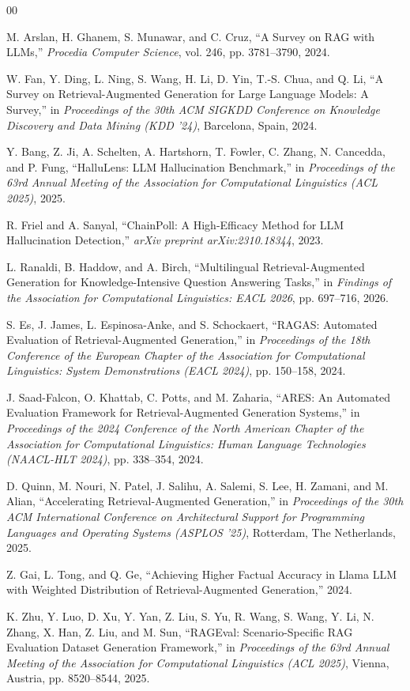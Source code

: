 \documentclass[conference]{IEEEtran}
\begin{document}
\begin{thebibliography}{00}

M. Arslan, H. Ghanem, S. Munawar, and C. Cruz,
``A Survey on RAG with LLMs,''
\textit{Procedia Computer Science}, vol. 246, pp. 3781--3790, 2024.

W. Fan, Y. Ding, L. Ning, S. Wang, H. Li, D. Yin, T.-S. Chua, and Q. Li,
``A Survey on Retrieval-Augmented Generation for Large Language Models: A Survey,''
in \textit{Proceedings of the 30th ACM SIGKDD Conference on Knowledge Discovery and Data Mining (KDD '24)}, Barcelona, Spain, 2024.

Y. Bang, Z. Ji, A. Schelten, A. Hartshorn, T. Fowler, C. Zhang, N. Cancedda, and P. Fung,
``HalluLens: LLM Hallucination Benchmark,''
in \textit{Proceedings of the 63rd Annual Meeting of the Association for Computational Linguistics (ACL 2025)}, 2025.

R. Friel and A. Sanyal,
``ChainPoll: A High-Efficacy Method for LLM Hallucination Detection,''
\textit{arXiv preprint arXiv:2310.18344}, 2023.

L. Ranaldi, B. Haddow, and A. Birch,
``Multilingual Retrieval-Augmented Generation for Knowledge-Intensive Question Answering Tasks,''
in \textit{Findings of the Association for Computational Linguistics: EACL 2026}, pp. 697--716, 2026.

S. Es, J. James, L. Espinosa-Anke, and S. Schockaert,
``RAGAS: Automated Evaluation of Retrieval-Augmented Generation,''
in \textit{Proceedings of the 18th Conference of the European Chapter of the Association for Computational Linguistics: System Demonstrations (EACL 2024)}, pp. 150--158, 2024.

J. Saad-Falcon, O. Khattab, C. Potts, and M. Zaharia,
``ARES: An Automated Evaluation Framework for Retrieval-Augmented Generation Systems,''
in \textit{Proceedings of the 2024 Conference of the North American Chapter of the Association for Computational Linguistics: Human Language Technologies (NAACL-HLT 2024)}, pp. 338--354, 2024.

D. Quinn, M. Nouri, N. Patel, J. Salihu, A. Salemi, S. Lee, H. Zamani, and M. Alian,
``Accelerating Retrieval-Augmented Generation,''
in \textit{Proceedings of the 30th ACM International Conference on Architectural Support for Programming Languages and Operating Systems (ASPLOS '25)}, Rotterdam, The Netherlands, 2025.

Z. Gai, L. Tong, and Q. Ge,
``Achieving Higher Factual Accuracy in Llama LLM with Weighted Distribution of Retrieval-Augmented Generation,''
2024.

K. Zhu, Y. Luo, D. Xu, Y. Yan, Z. Liu, S. Yu, R. Wang, S. Wang, Y. Li, N. Zhang, X. Han, Z. Liu, and M. Sun,
``RAGEval: Scenario-Specific RAG Evaluation Dataset Generation Framework,''
in \textit{Proceedings of the 63rd Annual Meeting of the Association for Computational Linguistics (ACL 2025)}, Vienna, Austria, pp. 8520--8544, 2025.

\end{thebibliography}
\end{document}
